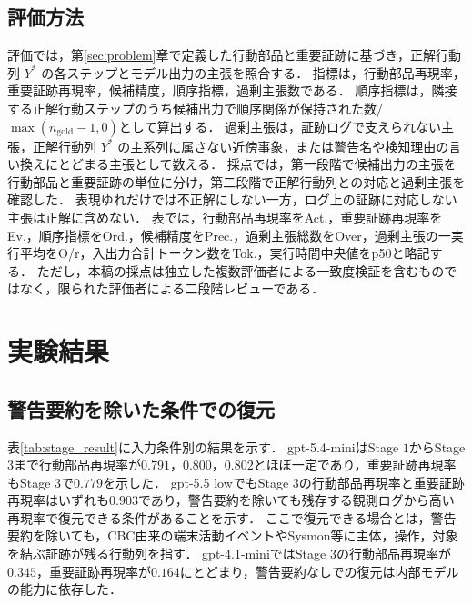 \documentclass[a4paper,twocolumn,10pt]{article}
\newcommand{\code}[1]{{\small\ttfamily #1}}
\begin{document}
\subsection{評価方法}

評価では，第\ref{sec:problem}章で定義した行動部品と重要証跡に基づき，正解行動列 \(Y^\ast\) の各ステップとモデル出力の主張を照合する．
指標は，行動部品再現率，重要証跡再現率，候補精度，順序指標，過剰主張数である．
順序指標は，隣接する正解行動ステップのうち候補出力で順序関係が保持された数/\(\max(n_{\mathrm{gold}}-1,0)\)として算出する．
過剰主張は，証跡ログで支えられない主張，正解行動列 \(Y^\ast\) の主系列に属さない近傍事象，または警告名や検知理由の言い換えにとどまる主張として数える．
採点では，第一段階で候補出力の主張を行動部品と重要証跡の単位に分け，第二段階で正解行動列との対応と過剰主張を確認した．
表現ゆれだけでは不正解にしない一方，ログ上の証跡に対応しない主張は正解に含めない．
表では，行動部品再現率をAct.，重要証跡再現率をEv.，順序指標をOrd.，候補精度をPrec.，過剰主張総数をOver，過剰主張の一実行平均をO/r，入出力合計トークン数をTok.，実行時間中央値をp50と略記する．
ただし，本稿の採点は独立した複数評価者による一致度検証を含むものではなく，限られた評価者による二段階レビューである．

\section{実験結果}

\subsection{警告要約を除いた条件での復元}

表\ref{tab:stage_result}に入力条件別の結果を示す．
\code{gpt-5.4-mini}はStage \(1\)からStage \(3\)まで行動部品再現率が\(0.791\)，\(0.800\)，\(0.802\)とほぼ一定であり，重要証跡再現率もStage \(3\)で\(0.779\)を示した．
\code{gpt-5.5 low}でもStage \(3\)の行動部品再現率と重要証跡再現率はいずれも\(0.903\)であり，警告要約を除いても残存する観測ログから高い再現率で復元できる条件があることを示す．
ここで復元できる場合とは，警告要約を除いても，CBC由来の端末活動イベントやSysmon等に主体，操作，対象を結ぶ証跡が残る行動列を指す．
\code{gpt-4.1-mini}ではStage \(3\)の行動部品再現率が\(0.345\)，重要証跡再現率が\(0.164\)にとどまり，警告要約なしでの復元は内部モデルの能力に依存した．
\end{document}
